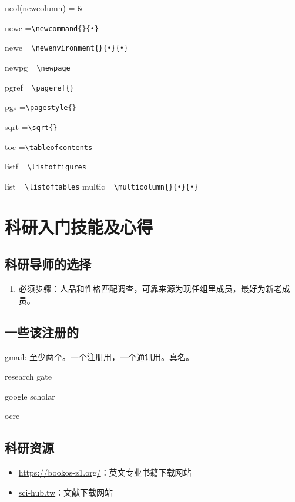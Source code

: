 ncol(newcolumn) = \verb|&|

newc  =\verb|\newcommand{}{•}|

newe  =\verb|\newenvironment{}{•}{•}|

newpg =\verb|\newpage|

pgref  =\verb|\pageref{}|

pgs   =\verb|\pagestyle{}|

sqrt   =\verb|\sqrt{}|

toc   =\verb|\tableofcontents|

listf   =\verb|\listoffigures|

list   =\verb|\listoftables|
multic =\verb|\multicolumn{}{•}{•}|







\chapter{科研入门技能及心得}
\section{科研导师的选择}
\begin{enumerate}
\item 必须步骤：人品和性格匹配调查，可靠来源为现任组里成员，最好为新老成员。
\end{enumerate}


\section{一些该注册的}
gmail: 至少两个。一个注册用，一个通讯用。真名。

research gate

google scholar

ocrc

\section{科研资源}
\begin{itemize}
\item \url{https://bookos-z1.org/}：英文专业书籍下载网站
\item \url{sci-hub.tw}：文献下载网站
\end{itemize}


